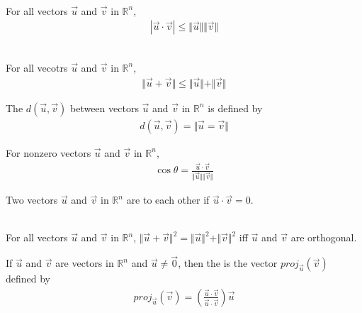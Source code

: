 \documentclass{article}
\begin{document}
\begin{theorem}
    \\
    For all vectors $\vec u$ and $\vec v$ in $\mathbb{R}^n$,
    \begin{gather*}
        |\vec u \cdot \vec v| \leq \Vert \vec u \Vert \Vert \vec v \Vert
    \end{gather*}
\end{theorem}
\begin{theorem}
    \\
    For all vecotrs $\vec u$ and $\vec v$ in $\mathbb{R}^n$,
    \begin{gather*}
        \Vert \vec u + \vec v \Vert \leq \Vert \vec u \Vert + \Vert \vec v \Vert
    \end{gather*}
\end{theorem}
\begin{definition}
    The  $d(\vec u, \vec v)$ between vectors $\vec u$ and $\vec v$ in $\mathbb{R}^n$ is defined by
    \begin{gather*}
        d(\vec u, \vec v) = \Vert \vec u = \vec v \Vert
    \end{gather*}
\end{definition}
\begin{definition}
    For nonzero vectors $\vec u$ and $\vec v$ in $\mathbb{R}^n$,
    \begin{gather*}
        \cos\theta = \frac{\vec u \cdot \vec v}{\Vert \vec u \Vert \Vert \vec v\Vert}
    \end{gather*}
\end{definition}
\begin{definition}
    Two vectors $\vec u$ and $\vec v$ in $\mathbb{R}^n$ are  to each other if $\vec u \cdot \vec v = 0$.
\end{definition}
\begin{theorem}
    \\
    For all vectors $\vec u$ and $\vec v$ in $\mathbb{R}^n$, $\Vert \vec u + \vec v\Vert^2 = \Vert \vec u \Vert^2 + \Vert \vec v \Vert ^2$ iff $\vec u$ and $\vec v$ are orthogonal.
\end{theorem}
\begin{definition}
    If $\vec u$ and $\vec v$ are vectors in $\mathbb{R}^n$ and $\vec u \not= \vec 0$, then the  is the vector $proj_{\vec u}(\vec v)$ defined by
    \begin{gather*}
        proj_{\vec u}(\vec v) = \left(\frac{\vec u \cdot \vec v}{\vec u \cdot \vec v}\right)\vec u
    \end{gather*}
\end{definition}
\end{document}
